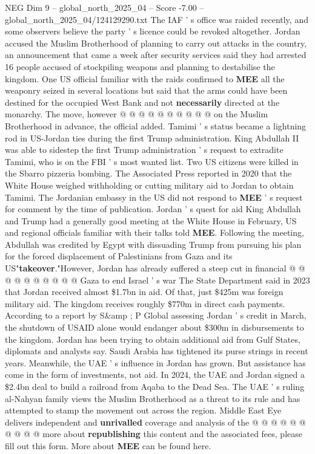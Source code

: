\begin{textsample}{NEG Dim 9 – global\_north\_2025\_04 – Score -7.00 – global\_north\_2025\_04/124129290.txt}
The IAF ' s office was raided recently, and some observers believe the party ' s licence could be revoked altogether.
Jordan accused the Muslim Brotherhood of planning to carry out attacks in the country, an announcement that came a week after security services said they had arrested 16 people accused of stockpiling weapons and planning to destabilise the kingdom.
One US official familiar with the raids confirmed to \textbf{MEE} all the weaponry seized in several locations but said that the arms could have been destined for the occupied West Bank and not \textbf{necessarily} directed at the monarchy.
The move, however @ @ @ @ @ @ @ @ @ @ on the Muslim Brotherhood in advance, the official added.
Tamimi ' s status became a lightning rod in US-Jordan ties during the first Trump administration.
King Abdullah II was able to sidestep the first Trump administration ' s request to extradite Tamimi, who is on the FBI ' s most wanted list.
Two US citizens were killed in the Sbarro pizzeria bombing.
The Associated Press reported in 2020 that the White House weighed withholding or cutting military aid to Jordan to obtain Tamimi.
The Jordanian embassy in the US did not respond to \textbf{MEE} ' s request for comment by the time of publication.
Jordan ' s quest for aid King Abdullah and Trump had a generally good meeting at the White House in February, US and regional officials familiar with their talks told \textbf{MEE}.
Following the meeting, Abdullah was credited by Egypt with dissuading Trump from pursuing his plan for the forced displacement of Palestinians from Gaza and its US"\textbf{takeover}."However, Jordan has already suffered a steep cut in financial @ @ @ @ @ @ @ @ @ @ Gaza to end Israel ' s war The State Department said in 2023 that Jordan received almost \$1.7bn in aid.
Of that, just \$425m was foreign military aid.
The kingdom receives roughly \$770m in direct cash payments.
According to a report by S\&amp ; P Global assessing Jordan ' s credit in March, the shutdown of USAID alone would endanger about \$300m in disbursements to the kingdom.
Jordan has been trying to obtain additional aid from Gulf States, diplomats and analysts say.
Saudi Arabia has tightened its purse strings in recent years.
Meanwhile, the UAE ' s influence in Jordan has grown.
But assistance has come in the form of investments, not aid.
In 2024, the UAE and Jordan signed a \$2.4bn deal to build a railroad from Aqaba to the Dead Sea.
The UAE ' s ruling al-Nahyan family views the Muslim Brotherhood as a threat to its rule and has attempted to stamp the movement out across the region.
Middle East Eye delivers independent and \textbf{unrivalled} coverage and analysis of the @ @ @ @ @ @ @ @ @ @ more about \textbf{republishing} this content and the associated fees, please fill out this form.
More about \textbf{MEE} can be found here.

\end{textsample}
